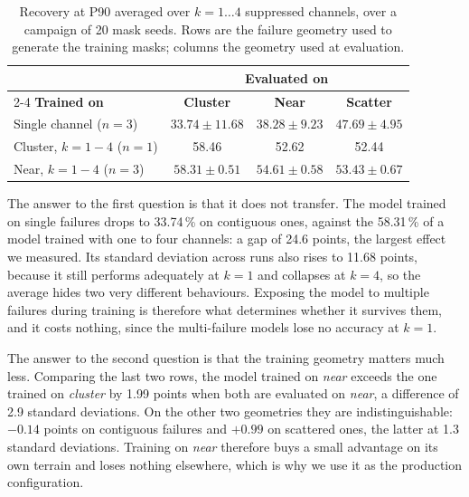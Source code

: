 \documentclass[10pt,conference]{IEEEtran}
\begin{document}
\begin{table}[t]
\centering
\caption{Recovery at P90 averaged over $k=1\dots4$ suppressed channels, over a
campaign of 20 mask seeds. Rows are the failure geometry used to generate the
training masks; columns the geometry used at evaluation.}
\label{tab:multidead}
\begin{tabular}{@{}lccc@{}}
\toprule
& \multicolumn{3}{c}{\textbf{Evaluated on}} \\
\cmidrule(l){2-4}
\textbf{Trained on} & \textbf{Cluster} & \textbf{Near} & \textbf{Scatter} \\
\midrule
Single channel ($n{=}3$)
  & $33.74 \pm 11.68$ & $38.28 \pm 9.23$ & $47.69 \pm 4.95$ \\
Cluster, $k{=}1\!-\!4$ ($n{=}1$)
  & 58.46 & 52.62 & 52.44 \\
Near, $k{=}1\!-\!4$ ($n{=}3$)
  & $58.31 \pm 0.51$ & $54.61 \pm 0.58$ & $53.43 \pm 0.67$ \\
\bottomrule
\end{tabular}
\end{table}

The answer to the first question is that it does not transfer. The model trained
on single failures drops to 33.74\,\% on contiguous ones, against the 58.31\,\%
of a model trained with one to four channels: a gap of 24.6 points, the largest
effect we measured. Its standard deviation across runs also rises to 11.68
points, because it still performs adequately at $k=1$ and collapses at $k=4$, so
the average hides two very different behaviours. Exposing the model to multiple
failures during training is therefore what determines whether it survives them,
and it costs nothing, since the multi-failure models lose no accuracy at $k=1$.

The answer to the second question is that the training geometry matters much
less. Comparing the last two rows, the model trained on \emph{near} exceeds the
one trained on \emph{cluster} by 1.99 points when both are evaluated on
\emph{near}, a difference of 2.9 standard deviations. On the other two
geometries they are indistinguishable: $-0.14$ points on contiguous failures and
$+0.99$ on scattered ones, the latter at 1.3 standard deviations. Training on \emph{near} therefore buys a small advantage on its own terrain
and loses nothing elsewhere, which is why we use it as the production
configuration.
\end{document}
